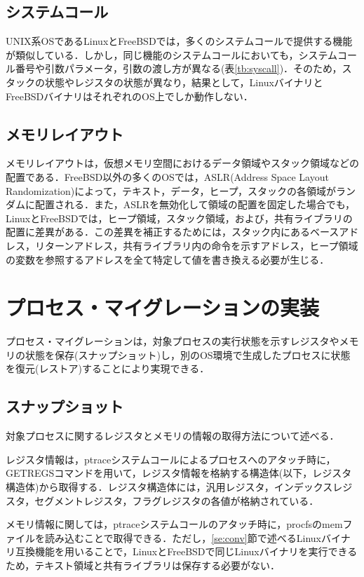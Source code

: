 \documentclass{ipsjpapers}
\begin{document}
\subsection{システムコール}
UNIX系OSであるLinuxとFreeBSDでは，多くのシステムコールで提供する機能が類似している．しかし，同じ機能のシステムコールにおいても，システムコール番号や引数パラメータ，引数の渡し方が異なる(表\ref{tb:syscall})．そのため，スタックの状態やレジスタの状態が異なり，結果として，LinuxバイナリとFreeBSDバイナリはそれぞれのOS上でしか動作しない．
\subsection{メモリレイアウト}
\label{memory-diff}
メモリレイアウトは，仮想メモリ空間におけるデータ領域やスタック領域などの配置である．FreeBSD以外の多くのOSでは，ASLR(Address Space Layout Randomization)によって，テキスト，データ，ヒープ，スタックの各領域がランダムに配置される．また，ASLRを無効化して領域の配置を固定した場合でも，LinuxとFreeBSDでは，ヒープ領域，スタック領域，および，共有ライブラリの配置に差異がある．この差異を補正するためには，スタック内にあるベースアドレス，リターンアドレス，共有ライブラリ内の命令を示すアドレス，ヒープ領域の変数を参照するアドレスを全て特定して値を書き換える必要が生じる．

\section{プロセス・マイグレーションの実装}
プロセス・マイグレーションは，対象プロセスの実行状態を示すレジスタやメモリの状態を保存(スナップショット)し，別のOS環境で生成したプロセスに状態を復元(レストア)することにより実現できる．

\subsection{スナップショット}
対象プロセスに関するレジスタとメモリの情報の取得方法について述べる．

レジスタ情報は，ptraceシステムコールによるプロセスへのアタッチ時に，GETREGSコマンドを用いて，レジスタ情報を格納する構造体(以下，レジスタ構造体)から取得する．レジスタ構造体には，汎用レジスタ，インデックスレジスタ，セグメントレジスタ，フラグレジスタの各値が格納されている．

メモリ情報に関しては，ptraceシステムコールのアタッチ時に，procfsのmemファイルを読み込むことで取得できる．ただし，\ref{se:conv}節で述べるLinuxバイナリ互換機能を用いることで，LinuxとFreeBSDで同じLinuxバイナリを実行できるため，テキスト領域と共有ライブラリは保存する必要がない．
\end{document}
